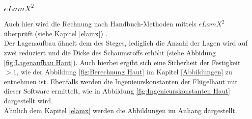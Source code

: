 \subsubsection{$eLamX^{2}$}

Auch hier wird die Rechnung nach Handbuch-Methoden mittels $eLamX^{2}$ überprüft (siehe Kapitel \ref{elamx}) \cite{item22}\cite{item3}. \\

\noindent Der Lagenaufbau ähnelt dem des Steges, lediglich die Anzahl der Lagen wird auf zwei reduziert und die Dicke des Schaumstoffs erhöht (siehe Abbidung \ref{fig:Lagenaufbau Haut}). Auch hierbei ergibt sich eine Sicherheit der Festigkeit $>1$, wie der Abbildung \ref{fig:Berechnung Haut} im  Kapitel \ref{Abbildungen} zu entnehmen ist. Ebenfalls werden die Ingenieurskonstanten der Flügelhaut mit dieser Software ermittelt, wie in Abbildung \ref{fig:Ingenieurskonstanten Haut} dargestellt wird.\\

\noindent Ähnlich dem Kapitel \ref{elamx} werden die Abbildungen im Anhang dargestellt.
